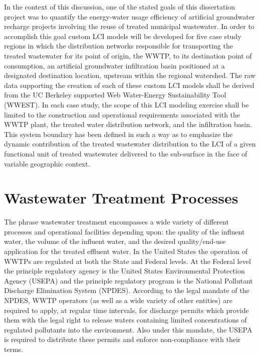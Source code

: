 In the context of this discussion, one of the stated goals of this dissertation project was to quantify the energy-water usage efficiency of artificial groundwater recharge projects involving the reuse of treated municipal wastewater. In order to accomplish this goal custom LCI models will be developed for five case study regions in which the distribution networks responsible for transporting the treated wastewater for its point of origin, the WWTP, to its destination point of consumption, an artificial groundwater infiltration basin positioned at a designated destination location, upstream within the regional watershed. The raw data supporting the creation of each of these custom LCI models shall be derived from the UC Berkeley supported Web Water-Energy Sustainability Tool (WWEST). In each case study, the scope of this LCI modeling exercise shall be limited to the construction and operational requirements associated with the WWTP plant, the treated water distribution network, and the infiltration basin. This system boundary has been defined in such a way as to emphasize the dynamic contribution of the treated wastewater distribution to the LCI of a given functional unit of treated wastewater delivered to the sub-surface in the face of variable geographic context.

\section{Wastewater Treatment Processes}

The phrase wastewater treatment encompasses a wide variety of different processes and operational facilities depending upon: the quality of the influent water, the volume of the influent water, and the desired quality/end-use application for the treated effluent water. In the United States the operation of WWTPs are regulated at both the State and Federal levels. At the Federal level the principle regulatory agency is the United States Environmental Protection Agency (USEPA) and the principle regulatory program is the National Pollutant Discharge Elimination System (NPDES). According to the legal mandate of the NPDES, WWTP operators (as well as a wide variety of other entities) are required to apply, at regular time intervals, for discharge permits which provide them with the legal right to release waters containing limited concentrations of regulated pollutants into the environment. Also under this mandate, the USEPA is required to distribute these permits and enforce non-compliance with their terms.

